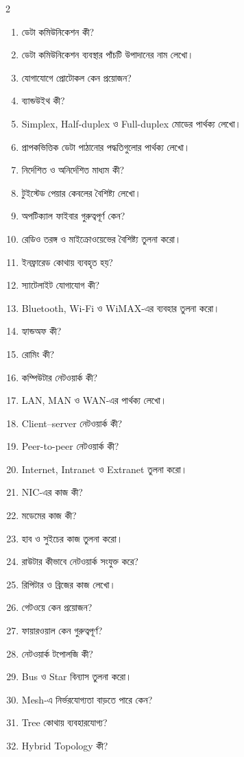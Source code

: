 \begin{multicols}{2}\begin{enumerate}
\item ডেটা কমিউনিকেশন কী?
\item ডেটা কমিউনিকেশন ব্যবস্থার পাঁচটি উপাদানের নাম লেখো।
\item যোগাযোগে প্রোটোকল কেন প্রয়োজন?
\item ব্যান্ডউইথ কী?
\item Simplex, Half-duplex ও Full-duplex মোডের পার্থক্য লেখো।
\item প্রাপকভিত্তিক ডেটা পাঠানোর পদ্ধতিগুলোর পার্থক্য লেখো।
\item নির্দেশিত ও অনির্দেশিত মাধ্যম কী?
\item টুইস্টেড পেয়ার কেবলের বৈশিষ্ট্য লেখো।
\item অপটিক্যাল ফাইবার গুরুত্বপূর্ণ কেন?
\item রেডিও তরঙ্গ ও মাইক্রোওয়েভের বৈশিষ্ট্য তুলনা করো।
\item ইনফ্রারেড কোথায় ব্যবহৃত হয়?
\item স্যাটেলাইট যোগাযোগ কী?
\item Bluetooth, Wi-Fi ও WiMAX-এর ব্যবহার তুলনা করো।
\item হ্যান্ডঅফ কী?
\item রোমিং কী?
\item কম্পিউটার নেটওয়ার্ক কী?
\item LAN, MAN ও WAN-এর পার্থক্য লেখো।
\item Client–server নেটওয়ার্ক কী?
\item Peer-to-peer নেটওয়ার্ক কী?
\item Internet, Intranet ও Extranet তুলনা করো।
\item NIC-এর কাজ কী?
\item মডেমের কাজ কী?
\item হাব ও সুইচের কাজ তুলনা করো।
\item রাউটার কীভাবে নেটওয়ার্ক সংযুক্ত করে?
\item রিপিটার ও ব্রিজের কাজ লেখো।
\item গেটওয়ে কেন প্রয়োজন?
\item ফায়ারওয়াল কেন গুরুত্বপূর্ণ?
\item নেটওয়ার্ক টপোলজি কী?
\item Bus ও Star বিন্যাস তুলনা করো।
\item Mesh-এ নির্ভরযোগ্যতা বাড়তে পারে কেন?
\item Tree কোথায় ব্যবহারযোগ্য?
\item Hybrid Topology কী?

\end{enumerate}
\end{multicols}

